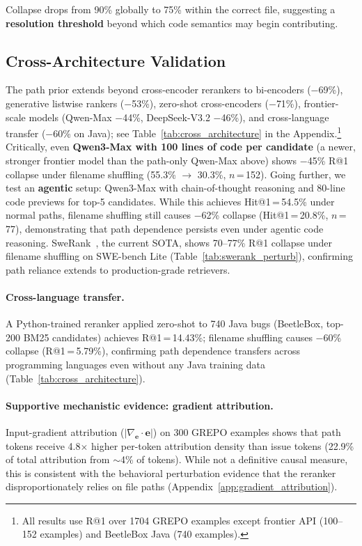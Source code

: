\documentclass{article}
\begin{document}
Collapse drops from 90\% globally to 75\% within the correct file, suggesting a \textbf{resolution threshold} beyond which code semantics may begin contributing.


\subsection{Cross-Architecture Validation}
\label{sec:cross_architecture}

The path prior extends beyond cross-encoder rerankers to bi-encoders ($-$69\%), generative listwise rankers ($-$53\%), zero-shot cross-encoders ($-$71\%), frontier-scale models (Qwen-Max $-$44\%, DeepSeek-V3.2 $-$46\%), and cross-language transfer ($-$60\% on Java); see Table~\ref{tab:cross_architecture} in the Appendix.\footnote{All results use R@1 over 1704 GREPO examples except frontier API (100--152 examples) and BeetleBox Java (740 examples).}
Critically, even \textbf{Qwen3-Max with 100 lines of code per candidate} (a newer, stronger frontier model than the path-only Qwen-Max above) shows $-$45\% R@1 collapse under filename shuffling (55.3\% $\to$ 30.3\%, $n$\,=\,152).
Going further, we test an \textbf{agentic} setup: Qwen3-Max with chain-of-thought reasoning and 80-line code previews for top-5 candidates.
While this achieves Hit@1\,=\,54.5\% under normal paths, filename shuffling still causes $-$62\% collapse (Hit@1\,=\,20.8\%, $n$\,=\,77), demonstrating that path dependence persists even under agentic code reasoning.
SweRank~\citep{reddy2025swerank}, the current SOTA, shows 70--77\% R@1 collapse under filename shuffling on SWE-bench Lite (Table~\ref{tab:swerank_perturb}), confirming path reliance extends to production-grade retrievers.

\paragraph{Cross-language transfer.}
A Python-trained reranker applied zero-shot to 740 Java bugs (BeetleBox, top-200 BM25 candidates) achieves R@1\,=\,14.43\%; filename shuffling causes $-$60\% collapse (R@1\,=\,5.79\%), confirming path dependence transfers across programming languages even without any Java training data (Table~\ref{tab:cross_architecture}).

\paragraph{Supportive mechanistic evidence: gradient attribution.}
Input-gradient attribution ($|{\nabla_{\mathbf{e}}} \cdot \mathbf{e}|$) on 300 GREPO examples shows that path tokens receive 4.8$\times$ higher per-token attribution density than issue tokens (22.9\% of total attribution from $\sim$4\% of tokens). While not a definitive causal measure, this is consistent with the behavioral perturbation evidence that the reranker disproportionately relies on file paths (Appendix~\ref{app:gradient_attribution}).
\end{document}
